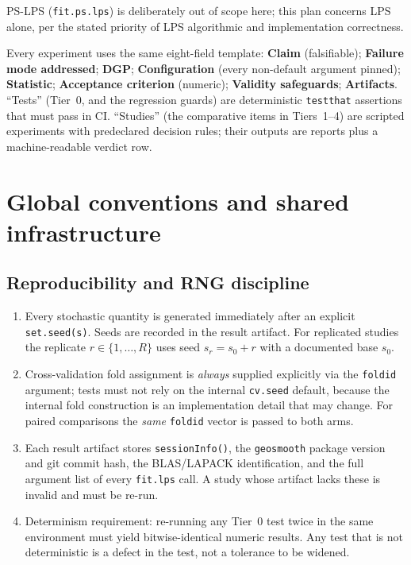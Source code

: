 \documentclass[11pt]{article}
\newcommand{\code}[1]{\texttt{#1}}
\begin{document}
PS-LPS (\code{fit.ps.lps}) is deliberately out of scope here; this plan concerns LPS
alone, per the stated priority of LPS algorithmic and implementation correctness.

Every experiment uses the same eight-field template: \textbf{Claim} (falsifiable);
\textbf{Failure mode addressed}; \textbf{DGP}; \textbf{Configuration} (every non-default
argument pinned); \textbf{Statistic}; \textbf{Acceptance criterion} (numeric);
\textbf{Validity safeguards}; \textbf{Artifacts}. ``Tests'' (Tier~0, and the regression
guards) are deterministic \code{testthat} assertions that must pass in CI. ``Studies''
(the comparative items in Tiers~1--4) are scripted experiments with predeclared decision
rules; their outputs are reports plus a machine-readable verdict row.

\section{Global conventions and shared infrastructure}
\label{sec:conventions}

\subsection{Reproducibility and RNG discipline}
\label{sec:rng}

\begin{enumerate}[leftmargin=1.4em]
\item Every stochastic quantity is generated immediately after an explicit
\code{set.seed(s)}. Seeds are recorded in the result artifact. For replicated studies the
replicate $r\in\{1,\dots,R\}$ uses seed $s_r = s_0 + r$ with a documented base $s_0$.
\item Cross-validation fold assignment is \emph{always} supplied explicitly via the
\code{foldid} argument; tests must not rely on the internal \code{cv.seed} default, because
the internal fold construction is an implementation detail that may change. For paired
comparisons the \emph{same} \code{foldid} vector is passed to both arms.
\item Each result artifact stores \code{sessionInfo()}, the \code{geosmooth} package
version and git commit hash, the BLAS/LAPACK identification, and the full argument list of
every \code{fit.lps} call. A study whose artifact lacks these is invalid and must be re-run.
\item Determinism requirement: re-running any Tier~0 test twice in the same environment
must yield bitwise-identical numeric results. Any test that is not deterministic is a
defect in the test, not a tolerance to be widened.
\end{enumerate}
\end{document}
